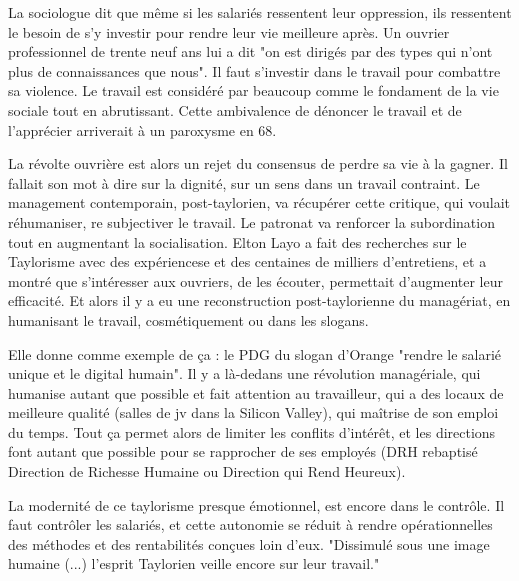 \documentclass[a4paper,12pt]{book}
\begin{document}
\par La sociologue dit que même si les salariés ressentent leur oppression, ils ressentent le besoin de s'y investir pour rendre leur vie meilleure après. Un ouvrier professionnel de trente neuf ans lui a dit "on est dirigés par des types qui n'ont plus de connaissances que nous". Il faut s'investir dans le travail pour combattre sa violence. Le travail est considéré par beaucoup comme le fondament de la vie sociale tout en abrutissant. Cette ambivalence de dénoncer le travail et de l'apprécier arriverait à un paroxysme en 68.
\par La révolte ouvrière est alors un rejet du consensus de perdre sa vie à la gagner. Il fallait son mot à dire sur la dignité, sur un sens dans un travail contraint. Le management contemporain, post-taylorien, va récupérer cette critique, qui voulait réhumaniser, re subjectiver le travail. Le patronat va renforcer la subordination tout en augmentant la socialisation. Elton Layo a fait des recherches sur le Taylorisme avec des expériencese et des centaines de milliers d'entretiens, et a montré que s'intéresser aux ouvriers, de les écouter, permettait d'augmenter leur efficacité. Et alors il y a eu une reconstruction post-taylorienne du managériat, en humanisant le travail, cosmétiquement ou dans les slogans.
\par Elle donne comme exemple de ça : le PDG du slogan d'Orange "rendre le salarié unique et le digital humain". Il y a là-dedans une révolution managériale, qui humanise autant que possible et fait attention au travailleur, qui a des locaux de meilleure qualité (salles de jv dans la Silicon Valley), qui maîtrise de son emploi du temps. Tout ça permet alors de limiter les conflits d'intérêt, et les directions font autant que possible pour se rapprocher de ses employés (DRH rebaptisé Direction de Richesse Humaine ou Direction qui Rend Heureux).
\par La modernité de ce taylorisme presque émotionnel, est encore dans le contrôle. Il faut contrôler les salariés, et cette autonomie se réduit à rendre opérationnelles des méthodes et des rentabilités conçues loin d'eux. "Dissimulé sous une image humaine (...) l'esprit Taylorien veille encore sur leur travail."
\end{document}
